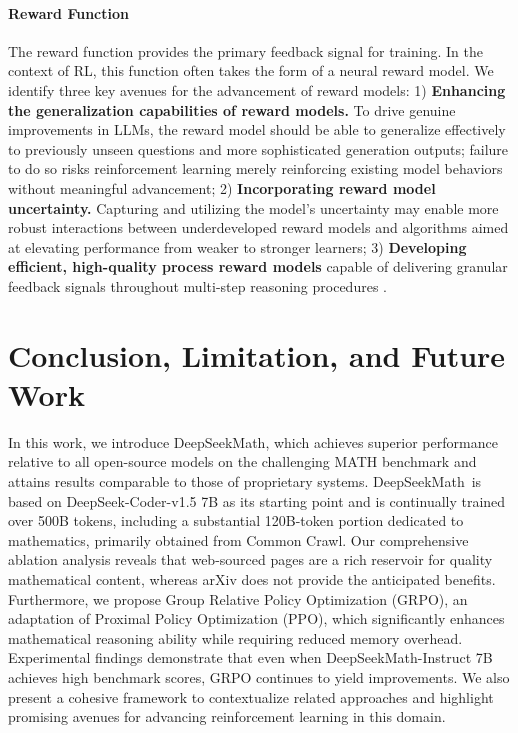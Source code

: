 \begin{itemize}[topsep=0pt]
\paragraph{Reward Function} The reward function provides the primary feedback signal for training. In the context of RL, this function often takes the form of a neural reward model. We identify three key avenues for the advancement of reward models: 1) \textbf{Enhancing the generalization capabilities of reward models.} To drive genuine improvements in LLMs, the reward model should be able to generalize effectively to previously unseen questions and more sophisticated generation outputs; failure to do so risks reinforcement learning merely reinforcing existing model behaviors without meaningful advancement; 2) \textbf{Incorporating reward model uncertainty.} Capturing and utilizing the model's uncertainty may enable more robust interactions between underdeveloped reward models and algorithms aimed at elevating performance from weaker to stronger learners; 3) \textbf{Developing efficient, high-quality process reward models} capable of delivering granular feedback signals throughout multi-step reasoning procedures \citep{lightman2023let,wang2023math}.

\section{Conclusion, Limitation, and Future Work} In this work, we introduce DeepSeekMath, which achieves superior performance relative to all open-source models on the challenging MATH benchmark and attains results comparable to those of proprietary systems. DeepSeekMath~is based on DeepSeek-Coder-v1.5 7B as its starting point and is continually trained over 500B tokens, including a substantial 120B-token portion dedicated to mathematics, primarily obtained from Common Crawl. Our comprehensive ablation analysis reveals that web-sourced pages are a rich reservoir for quality mathematical content, whereas arXiv does not provide the anticipated benefits. Furthermore, we propose Group Relative Policy Optimization (GRPO), an adaptation of Proximal Policy Optimization (PPO), which significantly enhances mathematical reasoning ability while requiring reduced memory overhead. Experimental findings demonstrate that even when DeepSeekMath-Instruct 7B achieves high benchmark scores, GRPO continues to yield improvements. We also present a cohesive framework to contextualize related approaches and highlight promising avenues for advancing reinforcement learning in this domain.


\end{itemize}
